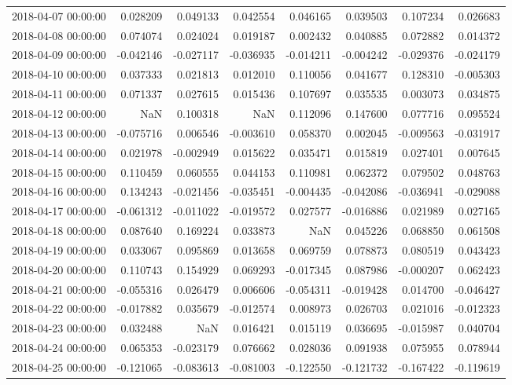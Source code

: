 \begin{tabular}{lrrrrrrr}
2018-04-07 00:00:00 & 0.028209 & 0.049133 & 0.042554 & 0.046165 & 0.039503 & 0.107234 & 0.026683 \\
2018-04-08 00:00:00 & 0.074074 & 0.024024 & 0.019187 & 0.002432 & 0.040885 & 0.072882 & 0.014372 \\
2018-04-09 00:00:00 & -0.042146 & -0.027117 & -0.036935 & -0.014211 & -0.004242 & -0.029376 & -0.024179 \\
2018-04-10 00:00:00 & 0.037333 & 0.021813 & 0.012010 & 0.110056 & 0.041677 & 0.128310 & -0.005303 \\
2018-04-11 00:00:00 & 0.071337 & 0.027615 & 0.015436 & 0.107697 & 0.035535 & 0.003073 & 0.034875 \\
2018-04-12 00:00:00 & NaN & 0.100318 & NaN & 0.112096 & 0.147600 & 0.077716 & 0.095524 \\
2018-04-13 00:00:00 & -0.075716 & 0.006546 & -0.003610 & 0.058370 & 0.002045 & -0.009563 & -0.031917 \\
2018-04-14 00:00:00 & 0.021978 & -0.002949 & 0.015622 & 0.035471 & 0.015819 & 0.027401 & 0.007645 \\
2018-04-15 00:00:00 & 0.110459 & 0.060555 & 0.044153 & 0.110981 & 0.062372 & 0.079502 & 0.048763 \\
2018-04-16 00:00:00 & 0.134243 & -0.021456 & -0.035451 & -0.004435 & -0.042086 & -0.036941 & -0.029088 \\
2018-04-17 00:00:00 & -0.061312 & -0.011022 & -0.019572 & 0.027577 & -0.016886 & 0.021989 & 0.027165 \\
2018-04-18 00:00:00 & 0.087640 & 0.169224 & 0.033873 & NaN & 0.045226 & 0.068850 & 0.061508 \\
2018-04-19 00:00:00 & 0.033067 & 0.095869 & 0.013658 & 0.069759 & 0.078873 & 0.080519 & 0.043423 \\
2018-04-20 00:00:00 & 0.110743 & 0.154929 & 0.069293 & -0.017345 & 0.087986 & -0.000207 & 0.062423 \\
2018-04-21 00:00:00 & -0.055316 & 0.026479 & 0.006606 & -0.054311 & -0.019428 & 0.014700 & -0.046427 \\
2018-04-22 00:00:00 & -0.017882 & 0.035679 & -0.012574 & 0.008973 & 0.026703 & 0.021016 & -0.012323 \\
2018-04-23 00:00:00 & 0.032488 & NaN & 0.016421 & 0.015119 & 0.036695 & -0.015987 & 0.040704 \\
2018-04-24 00:00:00 & 0.065353 & -0.023179 & 0.076662 & 0.028036 & 0.091938 & 0.075955 & 0.078944 \\
2018-04-25 00:00:00 & -0.121065 & -0.083613 & -0.081003 & -0.122550 & -0.121732 & -0.167422 & -0.119619 \\

\end{tabular}
